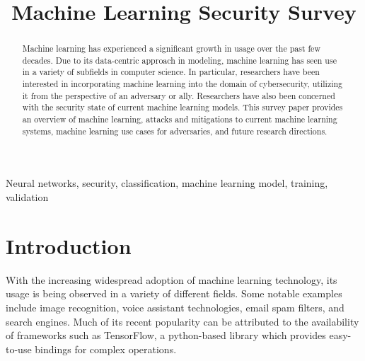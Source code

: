 \documentclass[11pt,conference]{IEEEtran}
\begin{document}
\title{Machine Learning Security Survey \\
}

\author{
}

\maketitle

\begin{abstract}
    Machine learning has experienced a significant growth in usage 
    over the past few decades. Due to its data-centric approach in modeling, 
    machine learning has seen use in a variety of subfields in computer science. In
    particular, researchers have been interested in incorporating machine learning
    into the domain of cybersecurity, utilizing it from the perspective of an
    adversary or ally. Researchers have also been concerned with the security state
    of current machine learning models. This survey paper provides an overview of
    machine learning, attacks and mitigations to current machine learning
    systems, machine learning use cases for adversaries, and future research
    directions.
\end{abstract}

\begin{IEEEkeywords}
    Neural networks, security, classification, machine learning model, training,
    validation
\end{IEEEkeywords}

\section{Introduction}
With the increasing widespread adoption of machine learning technology, its
usage is being observed in a variety of different fields. Some notable examples
include image recognition, voice assistant technologies, email spam filters, and search
engines. Much of its recent popularity can be attributed to the availability of
frameworks such as TensorFlow, a python-based library which provides
easy-to-use bindings for complex operations.
\end{document}
